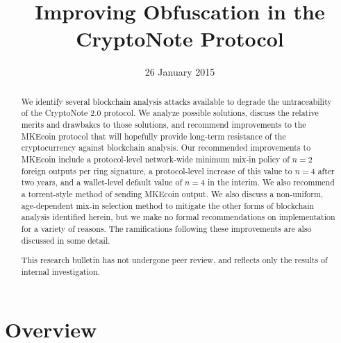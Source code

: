 \documentclass[12pt,english]{mrl}
\theoremstyle{definition}
\numberwithin{equation}{section}
\numberwithin{figure}{section}
\numberwithin{equation}{section}
\numberwithin{equation}{section}
\numberwithin{figure}{section}
\begin{document}
\begin{frontmatter}

\begin{fmbox}
\hfill\setlength{\fboxrule}{0px}\setlength{\fboxsep}{5px}
\title{Improving Obfuscation in the CryptoNote Protocol}
\date{26 January 2015}
\author[
   addressref={mrl},
   email={lab@getMKEcoin.org}
]{ }
\author[
   addressref={mrl},
   email={lab@getMKEcoin.org}
]{ }
\author[
   addressref={mrl},
   email={lab@getMKEcoin.org}
]{}


\address[id=mrl]{
}
\end{fmbox}


\begin{abstractbox}
\begin{abstract}
We identify several blockchain analysis attacks available to degrade the untraceability of the CryptoNote 2.0 protocol. We analyze possible solutions, discuss the relative merits and drawbakcs to those solutions, and recommend improvements to the MKEcoin protocol that will hopefully provide long-term resistance of the cryptocurrency against blockchain analysis. Our recommended improvements to MKEcoin include a protocol-level network-wide minimum mix-in policy of $n=2$ foreign outputs per ring signature, a protocol-level increase of this value to $n=4$ after two years, and a wallet-level default value of $n=4$ in the interim. We also recommend a torrent-style method of sending MKEcoin output. We also discuss a non-uniform, age-dependent mix-in selection method to mitigate the other forms of blockchain analysis identified herein, but we make no formal recommendations on implementation for a variety of reasons.  The ramifications following these improvements are also discussed in some detail.

This research bulletin has not undergone peer review, and reflects only the results of internal investigation.
\end{abstract}
\end{abstractbox}

\end{frontmatter}


\section{Overview}\label{overview}
\end{document}
